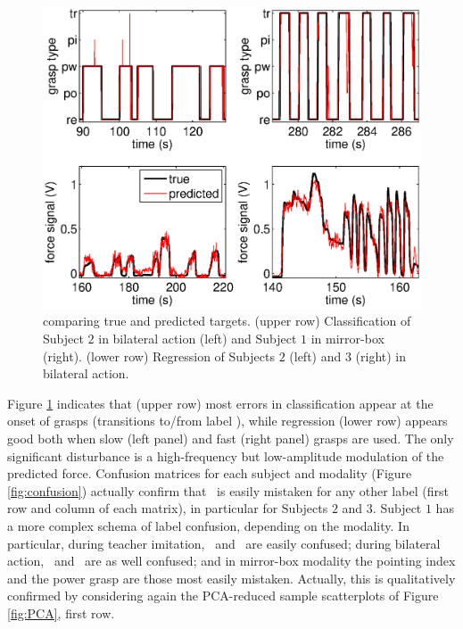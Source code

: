 \begin{figure}[!ht] \centering
  \includegraphics[width=\textwidth]{figs/figGuess}
  \caption{comparing true and predicted targets. (upper row) Classification
    of Subject $2$ in bilateral action (left) and Subject $1$ in mirror-box 
    (right). (lower row) Regression of Subjects $2$ (left) and $3$ (right)
    in bilateral action.}
  \label{fig:guess}
\end{figure}

Figure \ref{fig:guess} indicates that (upper row) most errors in classification
appear at the onset of grasps (transitions to/from label \re), while regression
(lower row) appears good both when slow (left panel) and fast (right panel) grasps
are used. The only significant disturbance is a high-frequency but low-amplitude
modulation of the predicted force. Confusion matrices for each subject and
modality (Figure \ref{fig:confusion}) actually confirm that \re\ is easily mistaken
for any other label (first row and column of each matrix), in particular for
Subjects $2$ and $3$. Subject $1$ has a more complex schema of label confusion,
depending on the modality. In particular, during teacher imitation, \pi\ and
\tr\ are easily confused; during bilateral action, \pi\ and \pw\ are as well
confused; and in mirror-box modality the pointing index and the power grasp
are those most easily mistaken. Actually, this is qualitatively confirmed by
considering again the PCA-reduced sample scatterplots of Figure \ref{fig:PCA},
first row.


